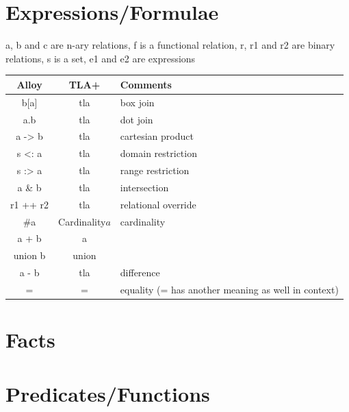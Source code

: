 \section{Expressions/Formulae}

a, b and c are n-ary relations, f is a functional relation, r, r1 and r2 are binary relations, s is a set, e1 and e2 are expressions

\begin{tabular}{ c | c | l }
	\hline			
	Alloy & TLA+ & Comments \\
	\hline
	b[a] & tla & box join \\
	a.b & tla & dot join \\
	a -> b & tla & cartesian product \\
	s <: a & tla & domain restriction \\
	s :> a & tla & range restriction \\
	a \& b & tla & intersection \\
	r1 ++ r2 & tla & relational override \\
	\#a & Cardinality\(a\) & cardinality \\
	a + b & a \\union b & union \\
	a - b & tla & difference \\
	= & = & equality (= has another meaning as well in context) \\


	\hline  
\end{tabular}

\section{Facts}

\section{Predicates/Functions}
